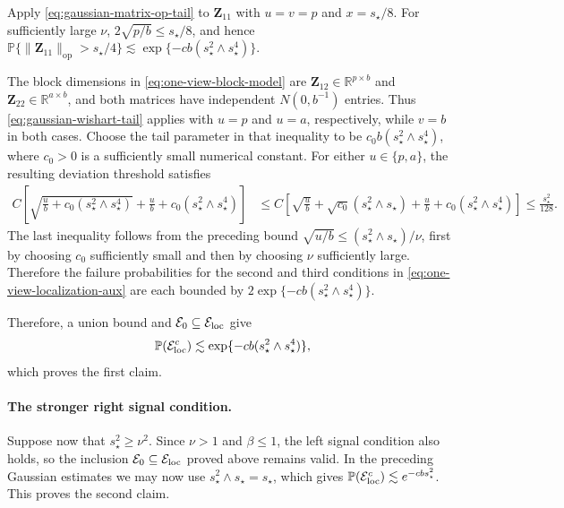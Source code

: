 \documentclass[11pt]{article}
\newcommand{\Pp}{\mathbb{P}}
\newcommand{\cE}{\mathcal{E}}
\begin{document}
Apply \cref{eq:gaussian-matrix-op-tail} to $\bm Z_{11}$ with
$u=v=p$ and $x=s_\star/8$. For sufficiently large $\nu$,
$2\sqrt{p/b}\le s_\star/8$, and hence
$\Pp\{\|\bm Z_{11}\|_{\mathrm{op}}>s_\star/4\}
\lesssim
\exp\{-cb(s_\star^2\wedge s_\star^4)\}$.


The block dimensions in \cref{eq:one-view-block-model} are
$\bm Z_{12}\in\mathbb R^{p\times b}$ and
$\bm Z_{22}\in\mathbb R^{a\times b}$, and both matrices have independent
$N(0,b^{-1})$ entries. Thus \cref{eq:gaussian-wishart-tail} applies with
$u=p$ and $u=a$, respectively, while $v=b$ in both cases. Choose the tail
parameter in that inequality to be
$c_0b(s_\star^2\wedge s_\star^4)$, where $c_0>0$ is a sufficiently small
numerical constant. For either $u\in\{p,a\}$, the resulting deviation
threshold satisfies
\[
\begin{aligned}
  C\left[
    \sqrt{\frac{u}{b}+c_0(s_\star^2\wedge s_\star^4)}
    +\frac{u}{b}
    +c_0(s_\star^2\wedge s_\star^4)
  \right]
  &\le
  C\left[
    \sqrt{\frac{u}{b}}
    +\sqrt{c_0}(s_\star^2\wedge s_\star)
    +\frac{u}{b}
    +c_0(s_\star^2\wedge s_\star^4)
  \right] \le
  \frac{s_\star^2}{128}.
\end{aligned}
\]
The last inequality follows from the preceding bound
$\sqrt{u/b}\le(s_\star^2\wedge s_\star)/\nu$, first by choosing $c_0$
sufficiently small and then by choosing $\nu$ sufficiently large. Therefore
the failure probabilities for the second and third conditions in
\cref{eq:one-view-localization-aux} are each bounded by
$2\exp\{-cb(s_\star^2\wedge s_\star^4)\}$.



Therefore, a union bound and $\cE_0\subseteq\cE_{\rm loc}$ give
\[
  \Pp(\cE_{\rm loc}^c)
  \lesssim
  \exp\{-cb(s_\star^2\wedge s_\star^4)\},
\]
which proves the first claim.

\paragraph{The stronger right signal condition.}
Suppose now that $s_\star^2\ge\nu^2$.
Since $\nu>1$ and $\beta\le1$, the left signal condition also holds, so
the inclusion $\cE_0\subseteq\cE_{\rm loc}$ proved above remains valid.
In the preceding Gaussian estimates we may now use
$s_\star^2\wedge s_\star=s_\star$, which gives
$\Pp(\cE_{\rm loc}^c)\lesssim e^{-cbs_\star^2}$.
This proves the second claim.
 
\end{document}
